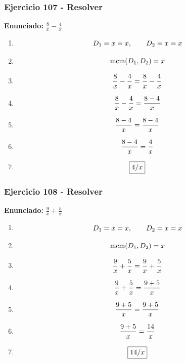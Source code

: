 \documentclass[11pt,a4paper]{article}
\newcommand{\fitmath}[1]{%
\[
\setbox0=\hbox{$\displaystyle #1$}%
\ifdim\wd0>\linewidth
\resizebox{\linewidth}{!}{$\displaystyle #1$}%
\else
#1%
\fi
\]
}
\begin{document}
\vspace{0.12cm}
\subsubsection*{Ejercicio 107 - Resolver}
\textbf{Enunciado:} $ \frac{8}{x} - \frac{4}{x} $\par
\begin{enumerate}[leftmargin=2em]
\item \fitmath{D_1=x=x,\qquad D_2=x=x}
\item \fitmath{\operatorname{mcm}(D_1,D_2)=x}
\item \fitmath{\frac{8}{x} - \frac{4}{x}= \frac{8}{x} - \frac{4}{x}}
\item \fitmath{\frac{8}{x} - \frac{4}{x}=\frac{8 - 4}{x}}
\item \fitmath{\frac{8 - 4}{x}=\frac{8 - 4}{x}}
\item \fitmath{\frac{8 - 4}{x}=\frac{4}{x}}
\item \fitmath{\boxed{4 / x}}
\end{enumerate}

\vspace{0.12cm}
\subsubsection*{Ejercicio 108 - Resolver}
\textbf{Enunciado:} $ \frac{9}{x} + \frac{5}{x} $\par
\begin{enumerate}[leftmargin=2em]
\item \fitmath{D_1=x=x,\qquad D_2=x=x}
\item \fitmath{\operatorname{mcm}(D_1,D_2)=x}
\item \fitmath{\frac{9}{x} + \frac{5}{x}= \frac{9}{x} + \frac{5}{x}}
\item \fitmath{\frac{9}{x} + \frac{5}{x}=\frac{9 + 5}{x}}
\item \fitmath{\frac{9 + 5}{x}=\frac{9 + 5}{x}}
\item \fitmath{\frac{9 + 5}{x}=\frac{14}{x}}
\item \fitmath{\boxed{14 / x}}
\end{enumerate}

\vspace{0.12cm}
\end{document}

